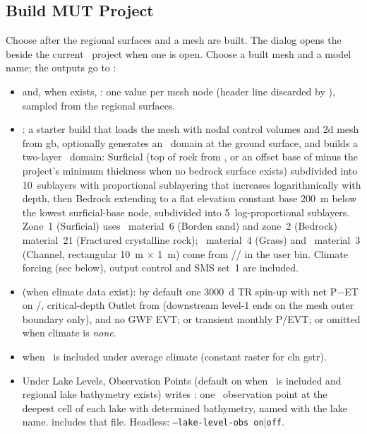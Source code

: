     \subsection{Build MUT Project}
        \label{qgis:BuildMut} 
        Choose  after the regional surfaces and a mesh are built.  The dialog opens the  beside the current \qgis\ project when one is open.  Choose a built mesh and a model name; the outputs go to :
        \begin{itemize}
        \item {} and, when  exists, : one value per mesh node (header line discarded by \mut), sampled from the regional surfaces.
        \item {}: a starter build that loads the mesh with {\sf nodal control volumes} and {\sf 2d mesh from gb}, optionally generates an \swf\ domain at the ground surface, and builds a two-layer \gwf\ domain: Surficial (top of rock from , or an {\sf offset base} of minus the project's minimum thickness when no bedrock surface exists) subdivided into 10~sublayers with {\sf proportional sublayering} that increases logarithmically with depth, then Bedrock extending to a flat {\sf elevation constant} base 200~m below the lowest surficial-base node, subdivided into 5~log-proportional sublayers.  Zone~1 (Surficial) uses \gwf\ material~6 (Borden sand) and zone~2 (Bedrock) material~21 (Fractured crystalline rock); \swf\ material~4 (Grass) and \cln\ material~3 (Channel, rectangular 10~m $\times$ 1~m) come from // in the user bin.  Climate forcing (see below), output control and SMS set~1 are included.
        \item {} (when climate data exist): by default one 3000~d TR spin-up with net P$-$ET on \cln/\swf, critical-depth {\sf Outlet} from  (downstream level-1 ends on the mesh outer boundary only), and no GWF EVT; or transient monthly P/EVT; or omitted when climate is {\em none}.
        \item {} when \cln\ is included under average climate (constant raster for {\sf cln gstr}).
        \item Under {\sf Lake Levels}, {\sf Observation Points} (default on when \swf\ is included and regional lake bathymetry exists) writes : one \swf\ {\sf observation point} at the deepest cell of each lake with determined bathymetry, named with the lake name.   includes that file.  Headless: {\tt --lake-level-obs on}|{\tt off}.
        \end{itemize}
